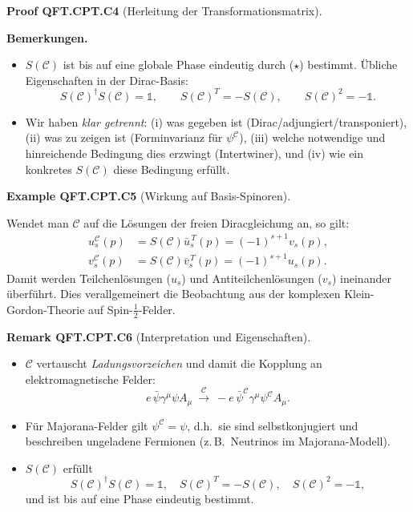 \documentclass[10pt, letterpaper]{article}
\newcommand{\CustomHeading}[3]{%
  \par\medskip\noindent%
  \textbf{#1 #2} \textnormal{(#3)}.\enskip%
}
\newenvironment{REM}[2]{\begin{unitbox}\CustomHeading{Remark}{#1}{#2}}{\end{unitbox}}
\newenvironment{EXA}[2]{\begin{unitbox}\CustomHeading{Example}{#1}{#2}}{\end{unitbox}}
\newenvironment{PROOF}[2]{\begin{unitbox}\CustomHeading{Proof}{#1}{#2}}{\end{unitbox}}
\begin{document}
\begin{PROOF}{QFT.CPT.C4}{Herleitung der Transformationsmatrix}
\textbf{Bemerkungen.}
\begin{itemize}
  \item $S(\mathcal C)$ ist bis auf eine globale Phase eindeutig durch ($\star$) bestimmt. Übliche Eigenschaften in der Dirac-Basis:
  \[
    S(\mathcal C)^\dagger S(\mathcal C)=\mathbb 1,\qquad
    S(\mathcal C)^T=-S(\mathcal C),\qquad
    S(\mathcal C)^2=-\mathbb 1.
  \]
  \item Wir haben \emph{klar getrennt}: (i) was gegeben ist (Dirac/adjungiert/transponiert), (ii) was zu zeigen ist (Forminvarianz für $\psi^{\mathcal C}$), (iii) welche notwendige und hinreichende Bedingung dies erzwingt (Intertwiner), und (iv) wie ein konkretes $S(\mathcal C)$ diese Bedingung erfüllt.
\end{itemize}
\end{PROOF}

\begin{EXA}{QFT.CPT.C5}{Wirkung auf Basis-Spinoren}
Wendet man $\mathcal C$ auf die Lösungen der freien Diracgleichung an, so gilt:
\[
\begin{aligned}
u_s^{\mathcal C}(p)&=S(\mathcal C)\bar u_s^{\,T}(p)
=(-1)^{s+1}v_s(p),\\
v_s^{\mathcal C}(p)&=S(\mathcal C)\bar v_s^{\,T}(p)
=(-1)^{s+1}u_s(p).
\end{aligned}
\]
Damit werden Teilchenlösungen ($u_s$) und Antiteilchenlösungen ($v_s$) ineinander überführt.
Dies verallgemeinert die Beobachtung aus der komplexen Klein-Gordon-Theorie auf Spin-$\tfrac{1}{2}$-Felder.
\end{EXA}

\begin{REM}{QFT.CPT.C6}{Interpretation und Eigenschaften}
\begin{itemize}
  \item $\mathcal C$ vertauscht \emph{Ladungsvorzeichen} und damit die Kopplung an elektromagnetische Felder:
  \[
  e\,\bar\psi\gamma^\mu\psi A_\mu
  \ \xrightarrow{\mathcal C}\
  -e\,\bar\psi^{\mathcal C}\gamma^\mu\psi^{\mathcal C}A_\mu.
  \]
  \item Für Majorana-Felder gilt $\psi^{\mathcal C}=\psi$, d.h.\ sie sind selbstkonjugiert und beschreiben ungeladene Fermionen (z.\,B.\ Neutrinos im Majorana-Modell).
  \item $S(\mathcal C)$ erfüllt
  \[
  S(\mathcal C)^\dagger S(\mathcal C)=\mathbb 1,\quad
  S(\mathcal C)^T=-S(\mathcal C),\quad
  S(\mathcal C)^2=-\mathbb 1,
  \]
  und ist bis auf eine Phase eindeutig bestimmt.
\end{itemize}
\end{REM}
\end{document}
